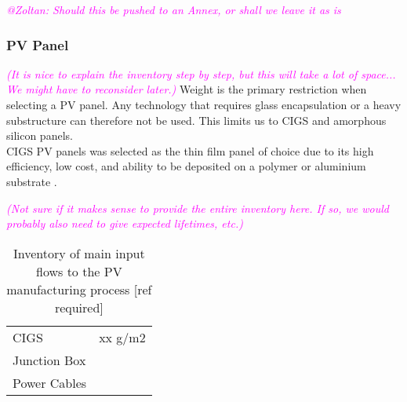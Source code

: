 \textcolor{magenta}{\textit{@Zoltan: Should this be pushed to an Annex, or shall we leave it as is}}

\subsubsection*{PV Panel}
\textcolor{magenta}{\textit{(It is nice to explain the inventory step by step, but this will take a lot of space... We might have to reconsider later.)}}
Weight is the primary restriction when selecting a PV panel. Any technology that requires glass encapsulation or a heavy substructure can therefore not be used. This limits us to CIGS and amorphous silicon panels.\\

CIGS PV panels was selected as the thin film panel of choice due to its high efficiency, low cost, and ability to be deposited on a polymer or aluminium substrate \cite{chirilua2011highly}. 


\textcolor{magenta}{\textit{(Not sure if it makes sense to provide the entire inventory here. If so, we would probably also need to give expected lifetimes, etc.)}}


\begin{table}[H]
\centering
\begin{tabular}{ll}
\hline
CIGS         & xx g/m2 \\
Junction Box &         \\
Power Cables &         \\
\hline
\end{tabular}
\caption{Inventory of main input flows to the PV manufacturing process [ref required]}
\label{tab:PVinv}
\end{table}


